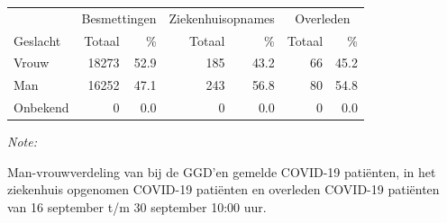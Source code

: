 \documentclass[
  english,
  man,floatsintext]{apa6}
\begin{document}
\begin{table}[H]
\centering\begingroup\fontsize{11}{13}\selectfont

\begin{threeparttable}
\begin{tabular}{lrrrrrr}
\toprule
\multicolumn{1}{c}{ } & \multicolumn{2}{c}{Besmettingen} & \multicolumn{2}{c}{Ziekenhuisopnames} & \multicolumn{2}{c}{Overleden} \\
\cmidrule(l{3pt}r{3pt}){2-3} \cmidrule(l{3pt}r{3pt}){4-5} \cmidrule(l{3pt}r{3pt}){6-7}
Geslacht & Totaal & \% & Totaal & \% & Totaal & \%\\
\midrule
Vrouw & 18273 & 52.9 & 185 & 43.2 & 66 & 45.2\\
Man & 16252 & 47.1 & 243 & 56.8 & 80 & 54.8\\
Onbekend & 0 & 0.0 & 0 & 0.0 & 0 & 0.0\\
\bottomrule
\end{tabular}
\begin{tablenotes}
\item \textit{Note: } 
\item Man-vrouwverdeling van bij de GGD’en gemelde COVID-19 patiënten, in het ziekenhuis opgenomen COVID-19 patiënten en overleden COVID-19 patiënten van 16 september t/m 30 september 10:00 uur.
\end{tablenotes}
\end{threeparttable}
\endgroup{}
\end{table}
\newpage
\end{document}
